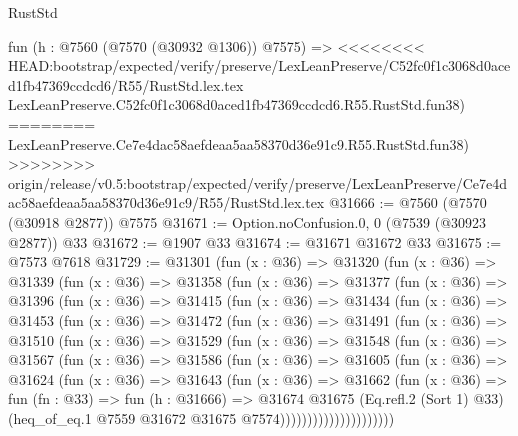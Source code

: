 \begin{lexlean}{RustStd}
\begin{coremodule}
{\begin{coremodule}
{{{{{{{{{{{{{{{{{{{{{{{{{{{{{{{{{{{{{{{{{{{    fun (h : @7560 (@7570 (@30932 @1306)) @7575) =>
<<<<<<<< HEAD:bootstrap/expected/verify/preserve/LexLeanPreserve/C52fc0f1c3068d0aced1fb47369ccdcd6/R55/RustStd.lex.tex
    LexLeanPreserve.C52fc0f1c3068d0aced1fb47369ccdcd6.R55.RustStd.fun38)
========
    LexLeanPreserve.Ce7e4dac58aefdeaa5aa58370d36e91c9.R55.RustStd.fun38)
>>>>>>>> origin/release/v0.5:bootstrap/expected/verify/preserve/LexLeanPreserve/Ce7e4dac58aefdeaa5aa58370d36e91c9/R55/RustStd.lex.tex
@31666 := @7560 (@7570 (@30918 @2877)) @7575
@31671 := Option.noConfusion.{0, 0} (@7539 (@30923 @2877)) @33
@31672 := @1907 @33
@31674 := @31671 @31672 @33
@31675 := @7573 @7618
@31729 := @31301
    (fun (x : @36) =>
    @31320
      (fun (x : @36) =>
      @31339
        (fun (x : @36) =>
        @31358
          (fun (x : @36) =>
          @31377
            (fun (x : @36) =>
            @31396
              (fun (x : @36) =>
              @31415
                (fun (x : @36) =>
                @31434
                  (fun (x : @36) =>
                  @31453
                    (fun (x : @36) =>
                    @31472
                      (fun (x : @36) =>
                      @31491
                        (fun (x : @36) =>
                        @31510
                          (fun (x : @36) =>
                          @31529
                            (fun (x : @36) =>
                            @31548
                              (fun (x : @36) =>
                              @31567
                                (fun (x : @36) =>
                                @31586
                                  (fun (x : @36) =>
                                  @31605
                                    (fun (x : @36) =>
                                    @31624
                                      (fun (x : @36) =>
                                      @31643
                                        (fun (x : @36) =>
                                        @31662
                                          (fun (x : @36) =>
                                          fun (fn : @33) =>
                                          fun (h : @31666) =>
                                          @31674
                                            @31675
                                            (Eq.refl.{2} (Sort 1) @33)
                                            (heq_of_eq.{1}
                                              @7559
                                              @31672
                                              @31675
                                              @7574)))))))))))))))))))))
}}}}}}}}}}}}}}}}}}}}}}}}}}}}}}}}}}}}}}}}}}}
\end{coremodule}}
\end{coremodule}
\end{lexlean}
